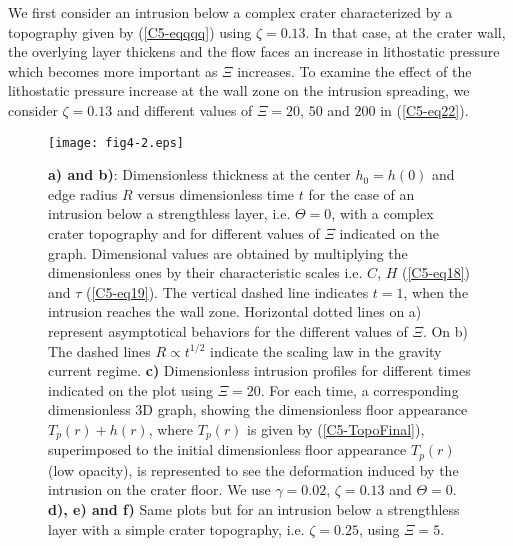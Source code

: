 We first consider an intrusion below a complex crater characterized by
a topography  given by  (\ref{C5-eqqqq}) using $\zeta=0.13$.   In that
case, at  the crater wall, the  overlying layer thickens and  the flow
faces an increase in lithostatic pressure which becomes more important
as $\Xi$ increases.  To examine the effect of the lithostatic pressure
increase  at the  wall zone  on the  intrusion spreading,  we consider
$\zeta=0.13$  and different  values  of $\Xi=20$,  $50$  and $200$  in
(\ref{C5-eq22}).

\begin{figure}[h!]
  \graphicspath{ {/Users/thorey/Documents/These/Manuscript/Figure/Chapter5/} }
  \centering
  \noindent\texttt{[image: fig4-2.eps]}
  \caption{\textbf{a) and  b)}: Dimensionless thickness at  the center
    $h_0=h(0)$ and edge  radius $R$ versus dimensionless  time $t$ for
    the  case  of  an  intrusion  below  a  strengthless  layer,  i.e.
    $\Theta=0$,  with a  complex crater  topography and  for different
    values of  $\Xi$ indicated on  the graph.  Dimensional  values are
    obtained   by  multiplying   the  dimensionless   ones  by   their
    characteristic scales  i.e.  $C$,  $H$ (\ref{C5-eq18})  and $\tau$
    (\ref{C5-eq19}). The  vertical dashed  line indicates  $t=1$, when
    the intrusion reaches the wall zone. Horizontal dotted lines on a)
    represent  asymptotical  behaviors  for the  different  values  of
    $\Xi$.  On  b) The  dashed lines  $R\propto t^{1/2}$  indicate the
    scaling   law  in   the  gravity   current  regime.    \textbf{c)}
    Dimensionless intrusion profiles for  different times indicated on
    the  plot   using  $\Xi=20$.   For  each   time,  a  corresponding
    dimensionless 3D graph, showing the dimensionless floor appearance
    $T_p(r)+h(r)$,  where $T_p(r)$  is given  by (\ref{C5-TopoFinal}),
    superimposed  to   the  initial  dimensionless   floor  appearance
    $T_p(r)$  (low opacity),  is  represented to  see the  deformation
    induced  by   the  intrusion   on  the   crater  floor.    We  use
    $\gamma=0.02$,  $\zeta=0.13$ and  $\Theta=0$.  \textbf{d),  e) and
      f)} Same plots  but for an intrusion below  a strengthless layer
    with a simple crater topography, i.e. $\zeta=0.25$, using $\Xi=5$. }
  \label{C5-fig4-2}
\end{figure}

